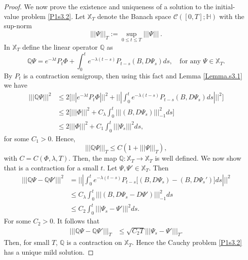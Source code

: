 \documentclass[review, onefignum, onetabnum]{siamart171218}
\begin{document}
\begin{proof}
We now prove the existence and uniqueness of a solution to the initial- value
problem \eqref{P1s3.2}. Let $\mathbb{X}_T$ denote the
Banach space $\mathcal{C}([0,T];\mathbb{H})$ with the sup-norm
 \begin{equation*}
  |||\Psi |||_T := \sup_{0\le t\le T} |||\Psi ||| \ .
 \end{equation*}
In $\mathbb{X}_T$ define the linear operator $\mathbb{Q}$ as
\begin{equation*}
 \mathbb{Q}\Psi= e^{-\lambda t}P_t\Phi + \int_0^t e^{-\lambda
(t-s)}P_{t-s}(B,D\Psi_s) ds,\quad\mbox{for any } \Psi\in\mathbb{X}_T.
\end{equation*}
By  $P_t$ is a contraction semigroup, then using this
fact and Lemma \ref{Lemma.s3.1} we have
\begin{align*}
 ||| \mathbb{Q}\Psi|||^2 &\le 2\Bigg[ ||| e^{-\lambda t}P_t\Phi|||^2 +
|||\int_0^t e^{-\lambda (t-s)}P_{t-s}(B,D\Psi_s) ds |||^2\Bigg]\\
 &\le 2\Big[ |||\Phi|||^2 + C_\lambda \int_0^t |||(B,D\Psi_s) |||_{-1}^2 ds
\Big] \\
 &\le 2 |||\Phi|||^2 + C_1 \int_0^t |||\Psi_s|||^2 ds,
\end{align*}
for some $C_1>0$. Hence,
\[
 ||| \mathbb{Q}\Psi|||_T \le C(1+||| \Psi|||_T),
\]
with $C=C(\Phi,\lambda, T)$. Then, the map $\mathbb{Q}:\mathbb{X}_T
\rightarrow \mathbb{X}_T$ is well defined. We now show that is a contraction
for a
small $t$. Let $\Psi,\Psi'\in \mathbb{X}_T$. Then
\begin{align*}
 ||| \mathbb{Q}\Psi- \mathbb{Q}\Psi'|||^2 &=  |||\int_0^t e^{-\lambda
(t-s)}P_{t-s}\big[(B,D\Psi_s)-(B,D\Psi_s')\big] ds |||^2\\
 &\le  C_\lambda \int_0^t |||(B,D\Psi_s-D\Psi') |||_{-1}^2 ds \\
 &\le  C_2 \int_0^t |||\Psi_s-\Psi'|||^2 ds.
\end{align*}
For some $C_2>0$. It follows that
\begin{align*}
 ||| \mathbb{Q}\Psi- \mathbb{Q}\Psi'|||_T  &\le  \sqrt{C_2 T}
|||\Psi_s-\Psi'|||_T.
\end{align*}
Then, for small $T$, $\mathbb{Q}$ is a contraction on $\mathbb{X}_T$. Hence
the Cauchy problem \eqref{P1s3.2} has a unique mild solution.

\end{proof}
\end{document}

